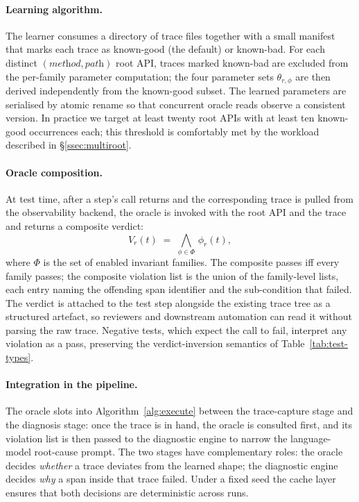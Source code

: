 \documentclass[conference]{IEEEtran}
\begin{document}
\paragraph{Learning algorithm.}
The learner consumes a directory of trace files together with a small manifest that marks each trace as known-good (the default) or known-bad. For each distinct $(\textit{method}, \textit{path})$ root API, traces marked known-bad are excluded from the per-family parameter computation; the four parameter sets $\theta_{r,\phi}$ are then derived independently from the known-good subset. The learned parameters are serialised by atomic rename so that concurrent oracle reads observe a consistent version. In practice we target at least twenty root APIs with at least ten known-good occurrences each; this threshold is comfortably met by the workload described in \S\ref{ssec:multiroot}.

\paragraph{Oracle composition.}
At test time, after a step's call returns and the corresponding trace is pulled from the observability backend, the oracle is invoked with the root API and the trace and returns a composite verdict:
\[
  V_{r}(t) \;=\; \bigwedge_{\phi \in \Phi}\, \phi_{r}(t),
\]
where $\Phi$ is the set of enabled invariant families. The composite passes iff every family passes; the composite violation list is the union of the family-level lists, each entry naming the offending span identifier and the sub-condition that failed. The verdict is attached to the test step alongside the existing trace tree as a structured artefact, so reviewers and downstream automation can read it without parsing the raw trace. Negative tests, which expect the call to fail, interpret any violation as a pass, preserving the verdict-inversion semantics of Table~\ref{tab:test-types}.

\paragraph{Integration in the pipeline.}
The oracle slots into Algorithm~\ref{alg:execute} between the trace-capture stage and the diagnosis stage: once the trace is in hand, the oracle is consulted first, and its violation list is then passed to the diagnostic engine to narrow the language-model root-cause prompt. The two stages have complementary roles: the oracle decides \emph{whether} a trace deviates from the learned shape; the diagnostic engine decides \emph{why} a span inside that trace failed. Under a fixed seed the cache layer ensures that both decisions are deterministic across runs.
\end{document}
